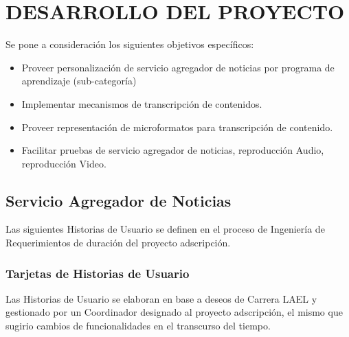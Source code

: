 \chapter{DESARROLLO DEL PROYECTO}

Se pone a consideraci\'{o}n los siguientes objetivos espec\'{i}ficos:

\begin{itemize}

\item Proveer personalizaci\'{o}n de servicio agregador de noticias por programa
de aprendizaje (sub-categor\'{i}a)
\item Implementar mecanismos de transcripci\'{o}n de contenidos.
\item Proveer representaci\'{o}n de microformatos para transcripci\'{o}n de 
contenido.
\item Facilitar pruebas de servicio agregador de noticias, reproducci\'{o}n Audio,
reproducci\'{o}n Video.

\end{itemize}

\section{Servicio Agregador de Noticias}

Las siguientes Historias de Usuario se definen en el proceso de Ingenier\'{i}a de
Requerimientos de duraci\'{o}n del proyecto adscripci\'{o}n.  

\subsection{Tarjetas de Historias de Usuario}

Las Historias de Usuario se elaboran en base a deseos de Carrera LAEL y
gestionado por un Coordinador designado al proyecto adscripci\'{o}n, el mismo
que sugirio cambios de funcionalidades en el transcurso del tiempo.

